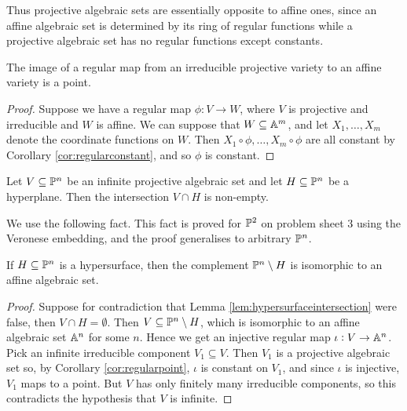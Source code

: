 Thus projective algebraic sets are essentially opposite to affine ones, since an affine algebraic set is determined by its ring of regular functions while a projective algebraic set has no regular functions except constants.

\begin{corollary}
\label{cor:regularpoint}
The image of a regular map from an irreducible projective variety to an affine variety is a point.
\end{corollary}

\begin{proof}
Suppose we have a regular map $ \phi : V \to W $, where $ V $ is projective and irreducible and $ W $ is affine. We can suppose that $ W \subseteq \AA^m $, and let $ X_1, \dots, X_m $ denote the coordinate functions on $ W $. Then $ X_1 \circ \phi, \dots, X_m \circ \phi $ are all constant by Corollary \ref{cor:regularconstant}, and so $ \phi $ is constant.
\end{proof}

\begin{lemma}
\label{lem:hypersurfaceintersection}
Let $ V \subseteq \PP^n $ be an infinite projective algebraic set and let $ H \subseteq \PP^n $ be a hyperplane. Then the intersection $ V \cap H $ is non-empty.
\end{lemma}

We use the following fact. This fact is proved for $ \PP^2 $ on problem sheet $ 3 $ using the Veronese embedding, and the proof generalises to arbitrary $ \PP^n $.

\begin{fact*}
If $ H \subseteq \PP^n $ is a hypersurface, then the complement $ \PP^n \setminus H $ is isomorphic to an affine algebraic set.
\end{fact*}

\begin{proof}
Suppose for contradiction that Lemma \ref{lem:hypersurfaceintersection} were false, then $ V \cap H = \emptyset $. Then $ V \subseteq \PP^n \setminus H $, which is isomorphic to an affine algebraic set $ \AA^n $ for some $ n $. Hence we get an injective regular map $ \iota : V \to \AA^n $. Pick an infinite irreducible component $ V_1 \subseteq V $. Then $ V_1 $ is a projective algebraic set so, by Corollary \ref{cor:regularpoint}, $ \iota $ is constant on $ V_1 $, and since $ \iota $ is injective, $ V_1 $ maps to a point. But $ V $ has only finitely many irreducible components, so this contradicts the hypothesis that $ V $ is infinite.
\end{proof}

